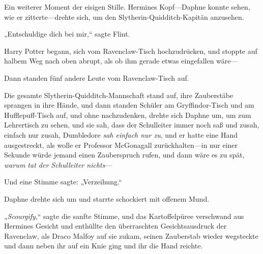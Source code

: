 Ein weiterer Moment der eisigen Stille. Hermines Kopf—Daphne konnte sehen, wie er zitterte—drehte sich, um den Slytherin-Quidditch-Kapitän anzusehen.

„Entschuldige dich bei mir,“ sagte Flint.

Harry Potter begann, sich vom Ravenclaw-Tisch hochzudrücken, und stoppte auf halbem Weg nach oben abrupt, als ob ihm gerade etwas eingefallen wäre—

Dann standen fünf andere Leute vom Ravenclaw-Tisch auf.

Die gesamte Slytherin-Quidditch-Mannschaft stand auf, ihre Zauberstäbe sprangen in ihre Hände, und dann standen Schüler am Gryffindor-Tisch und am Hufflepuff-Tisch auf, und ohne nachzudenken, drehte sich Daphne um, um zum Lehrertisch zu sehen, und sie sah, dass der Schulleiter immer noch saß und zusah, einfach nur zusah, Dumbledore \emph{sah einfach nur zu}, und er hatte eine Hand ausgestreckt, als wolle er Professor McGonagall zurückhalten—in nur einer Sekunde würde jemand einen Zauberspruch rufen, und dann wäre es zu spät, \emph{warum tat der Schulleiter nichts}—

Und eine Stimme sagte: „Verzeihung.“

Daphne drehte sich um und starrte schockiert mit offenem Mund.

„\emph{Scourgify},“ sagte die sanfte Stimme, und das Kartoffelpüree verschwand aus Hermines Gesicht und enthüllte den überraschten Gesichtsausdruck der Ravenclaw, als Draco Malfoy auf sie zukam, seinen Zauberstab wieder wegsteckte und dann neben ihr auf ein Knie ging und ihr die Hand reichte.

